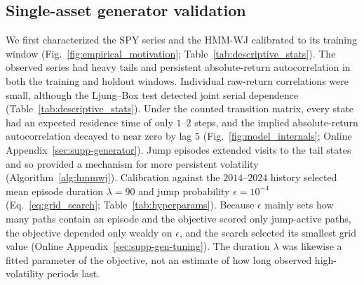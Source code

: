 \subsection{Single-asset generator validation}

We first characterized the SPY series and the HMM-WJ calibrated to its
training window (Fig.~\ref{fig:empirical_motivation};
Table~\ref{tab:descriptive_stats}). The observed series had heavy tails
and persistent absolute-return autocorrelation in both the training
and holdout windows. Individual raw-return correlations were small,
although the Ljung--Box test detected joint serial dependence
(Table~\ref{tab:descriptive_stats}). Under the counted transition
matrix, every state had an expected residence time of only $1$--$2$
steps, and the implied absolute-return autocorrelation decayed to near
zero by lag $5$ (Fig.~\ref{fig:model_internals}; Online
Appendix~\ref{sec:supp-generator}). Jump episodes extended visits to
the tail states and so provided a mechanism for more persistent
volatility (Algorithm~\ref{alg:hmmwj}). Calibration against the
$2014$--$2024$ history selected mean episode duration $\lambda=90$ and
jump probability $\epsilon=10^{-4}$ (Eq.~\eqref{eq:grid_search};
Table~\ref{tab:hyperparams}). Because $\epsilon$ mainly sets how many
paths contain an episode and the objective scored only jump-active
paths, the objective depended only weakly on $\epsilon$, and the search
selected its smallest grid value (Online
Appendix~\ref{sec:supp-gen-tuning}). The duration $\lambda$ was
likewise a fitted parameter of the objective, not an estimate of how
long observed high-volatility periods last.



